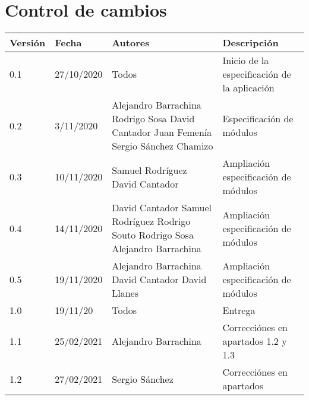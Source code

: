 \documentclass[12pt]{article}
\begin{document}
\section*{Control de cambios} %
\noindent\begin{tabularx}{\textwidth}{ |l|l|p{5cm}|X| }
	\hline
	\textbf{Versión} & \textbf{Fecha} & \textbf{Autores}                                                                                                         & \textbf{Descripción}                         \\
	\hline
	0.1              & 27/10/2020     & Todos                                                                                                                    & Inicio de la especificación de la aplicación \\
	\hline
	0.2              & 3/11/2020      & Alejandro Barrachina \newline Rodrigo Sosa \newline David Cantador \newline Juan Femenía \newline Sergio Sánchez Chamizo & Especificación de módulos                    \\
	\hline
	0.3              & 10/11/2020     & Samuel Rodríguez \newline David Cantador                                                                                 & Ampliación especificación de módulos         \\
	\hline
	0.4              & 14/11/2020     & David Cantador \newline Samuel Rodríguez \newline Rodrigo Souto \newline Rodrigo Sosa \newline Alejandro Barrachina      & Ampliación especificación de módulos         \\
	\hline
	0.5              & 19/11/2020     & Alejandro Barrachina \newline David Cantador \newline David Llanes                                                       & Ampliación especificación de módulos         \\
	\hline
	1.0              & 19/11/20       & Todos                                                                                                                    & Entrega                                      \\
	\hline
	1.1              & 25/02/2021     & Alejandro Barrachina                                                                                                     & Correcciónes en apartados 1.2 y 1.3          \\
	\hline
	1.2              & 27/02/2021     & Sergio Sánchez                                                                                                           & Correcciónes en apartados                    \\
	\hline
\end{tabularx}

\newpage
\tableofcontents
\newpage


\newpage

\newpage

\end{document}
